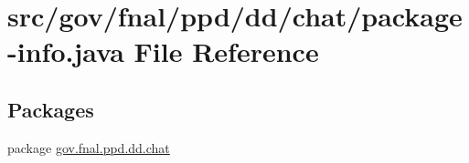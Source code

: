 \hypertarget{dd_2chat_2package-info_8java}{\section{src/gov/fnal/ppd/dd/chat/package-\/info.java File Reference}
\label{dd_2chat_2package-info_8java}
}
\subsection*{Packages}
\begin{DoxyCompactItemize}
\item 
package \hyperlink{namespacegov_1_1fnal_1_1ppd_1_1dd_1_1chat}{gov.\-fnal.\-ppd.\-dd.\-chat}
\end{DoxyCompactItemize}
